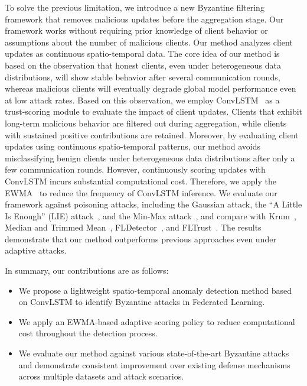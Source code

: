 \documentclass[journal]{IEEEtran}
\begin{document}
To solve the previous limitation, we introduce a new Byzantine filtering framework that removes malicious updates before the aggregation stage. Our framework works without requiring prior knowledge of client behavior or assumptions about the number of malicious clients. Our method analyzes client updates as continuous spatio-temporal data. The core idea of our method is based on the observation that honest clients, even under heterogeneous data distributions, will show stable behavior after several communication rounds, whereas malicious clients will eventually degrade global model performance even at low attack rates. Based on this observation, we employ ConvLSTM~\cite{shi2015convolutional} as a trust-scoring module to evaluate the impact of client updates. Clients that exhibit long-term malicious behavior are filtered out during aggregation, while clients with sustained positive contributions are retained. Moreover, by evaluating client updates using continuous spatio-temporal patterns, our method avoids misclassifying benign clients under heterogeneous data distributions after only a few communication rounds. However, continuously scoring updates with ConvLSTM incurs substantial computational cost. Therefore, we apply the EWMA~\cite{hunter1986exponentially} to reduce the frequency of ConvLSTM inference. We evaluate our framework against poisoning attacks, including the Gaussian attack, the ``A Little Is Enough'' (LIE) attack~\cite{baruch2019little}, and the Min-Max attack~\cite{shejwalkar2021manipulating}, and compare with Krum~\cite{blanchard2017machine}, Median and Trimmed Mean~\cite{yin2018byzantine}, FLDetector~\cite{zhang2022fldetector}, and FLTrust~\cite{cao2020fltrust}. The results demonstrate that our method outperforms previous approaches even under adaptive attacks.

In summary, our contributions are as follows:
\begin{itemize}
    \item We propose a lightweight spatio-temporal anomaly detection method based on ConvLSTM to identify Byzantine attacks in Federated Learning.
    \item We apply an EWMA-based adaptive scoring policy to reduce computational cost throughout the detection process.
    \item We evaluate our method against various state-of-the-art Byzantine attacks and demonstrate consistent improvement over existing defense mechanisms across multiple datasets and attack scenarios.
\end{itemize}
\end{document}
